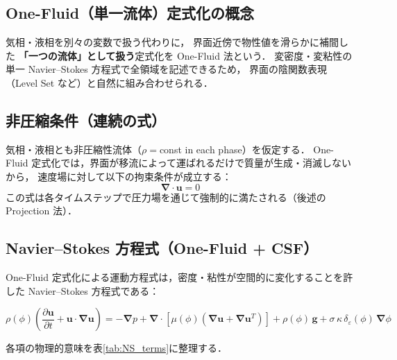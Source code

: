 \documentclass[12pt, a4paper, titlepage]{article}
\newcommand{\jp}[1]{{\normalfont\jpfont #1}}
\newcommand{\pd}[2]{\dfrac{\partial #1}{\partial #2}}
\newcommand{\bu}{\bm{u}}
\newcommand{\bg}{\bm{g}}
\newcommand{\bnabla}{\bm{\nabla}}
\newcommand{\de}{\delta_\varepsilon}
\begin{document}
\subsection{\jp{One-Fluid（単一流体）定式化の概念}}

\jp{気相・液相を別々の変数で扱う代わりに，
界面近傍で物性値を滑らかに補間した \textbf{「一つの流体」として扱う}定式化を One-Fluid 法という．
変密度・変粘性の単一 Navier--Stokes 方程式で全領域を記述できるため，
界面の陰関数表現（Level Set など）と自然に組み合わせられる．}

\subsection{\jp{非圧縮条件（連続の式）}}

\jp{気相・液相とも非圧縮性流体（$\rho = $const in each phase）を仮定する．
One-Fluid 定式化では，界面が移流によって運ばれるだけで質量が生成・消滅しないから，
速度場に対して以下の拘束条件が成立する：}
\begin{equation}
  \bnabla \cdot \bu = 0
  \label{eq:continuity}
\end{equation}
\jp{この式は各タイムステップで圧力場を通じて強制的に満たされる（後述の Projection 法）．}

\subsection{Navier--Stokes \jp{方程式（One-Fluid + CSF）}}

\jp{One-Fluid 定式化による運動方程式は，密度・粘性が空間的に変化することを許した
Navier--Stokes 方程式である：}

\begin{tcolorbox}[mybox, title={\jp{One-Fluid Navier--Stokes 方程式（次元形）}}]
\begin{equation}
  \rho(\phi)\!\left(\pd{\bu}{t} + \bu\cdot\bnabla\bu\right)
  = -\bnabla p
  + \bnabla\cdot\!\left[\mu(\phi)\!\left(\bnabla\bu + \bnabla\bu^T\right)\right]
  + \rho(\phi)\,\bg
  + \sigma\,\kappa\,\de(\phi)\,\bnabla\phi
  \label{eq:NS_dim}
\end{equation}
\end{tcolorbox}

\jp{各項の物理的意味を表\ref{tab:NS_terms}に整理する．}
\end{document}
